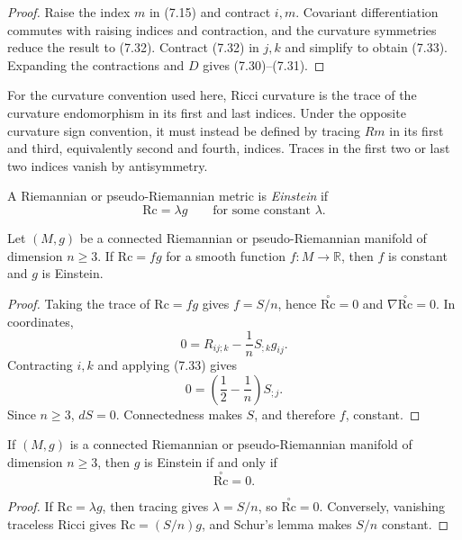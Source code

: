 \begin{proof}
\sketch Raise the index $m$ in (7.15) and contract $i,m$. Covariant
differentiation commutes with raising indices and contraction, and the
curvature symmetries reduce the result to (7.32). Contract (7.32) in $j,k$
and simplify to obtain (7.33). Expanding the contractions and $D$ gives
(7.30)--(7.31).
\end{proof}

For the curvature convention used here, Ricci curvature is the trace of the
curvature endomorphism in its first and last indices. Under the opposite
curvature sign convention, it must instead be defined by tracing $Rm$ in its
first and third, equivalently second and fourth, indices. Traces in the first
two or last two indices vanish by antisymmetry.

A Riemannian or pseudo-Riemannian metric is \emph{Einstein} if
\begin{equation}
\mathrm{Rc}=\lambda g
\qquad\text{for some constant }\lambda.
\tag{7.34}
\end{equation}

\begin{proposition}
\label{prop:schur-lemma}


Let $(M,g)$ be a connected Riemannian or pseudo-Riemannian manifold of
dimension $n\geq3$. If $\mathrm{Rc}=fg$ for a smooth function
$f:M\to\mathbb R$, then $f$ is constant and $g$ is Einstein.
\end{proposition}

\begin{proof}
\sketch Taking the trace of $\mathrm{Rc}=fg$ gives $f=S/n$, hence
$\stackrel{\circ}{\mathrm{Rc}}=0$ and
$\nabla\stackrel{\circ}{\mathrm{Rc}}=0$. In coordinates,
\[
0=R_{ij;k}-\frac1nS_{;k}g_{ij}.
\]
Contracting $i,k$ and applying (7.33) gives
\[
0=\left(\frac12-\frac1n\right)S_{;j}.
\]
Since $n\geq3$, $dS=0$. Connectedness makes $S$, and therefore $f$, constant.
\end{proof}

\begin{corollary}
\label{cor:einstein-zero-ricci}


If $(M,g)$ is a connected Riemannian or pseudo-Riemannian manifold of
dimension $n\geq3$, then $g$ is Einstein if and only if
\[
\stackrel{\circ}{\mathrm{Rc}}=0.
\]
\end{corollary}

\begin{proof}
\sketch If $\mathrm{Rc}=\lambda g$, then tracing gives $\lambda=S/n$, so
$\stackrel{\circ}{\mathrm{Rc}}=0$. Conversely, vanishing traceless Ricci gives
$\mathrm{Rc}=(S/n)g$, and Schur's lemma makes $S/n$ constant.
\end{proof}

